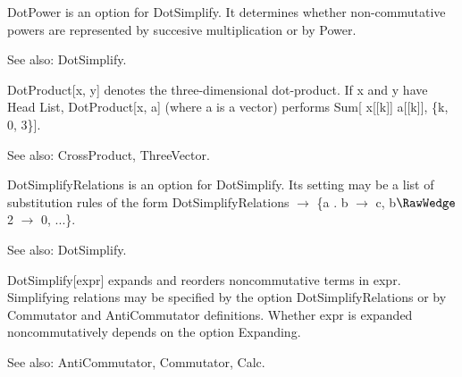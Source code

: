 

DotPower is an option for DotSimplify. It determines whether non-commutative powers are represented by succesive multiplication or by
  Power.

See also: DotSimplify.



DotProduct[x, y] denotes the three-dimensional dot-product. If x and y have Head List, DotProduct[x, a] (where a is a vector) performs
  Sum[ x[[k]] a[[k]], \{k, 0, 3\}].

See also:  CrossProduct, ThreeVector.






DotSimplifyRelations is an option for DotSimplify. Its setting may be a list of substitution rules of the form DotSimplifyRelations
  \(\rightarrow \) \{a . b \(\rightarrow \) c, b\(\RawWedge\)2 \(\rightarrow \) 0, ...\}.

See also: DotSimplify.



DotSimplify[expr] expands and reorders noncommutative terms in expr. Simplifying relations may be specified by the option
  DotSimplifyRelations or by Commutator and AntiCommutator definitions. Whether expr is expanded noncommutatively depends on the option
  Expanding.



See also:  AntiCommutator, Commutator, Calc.



